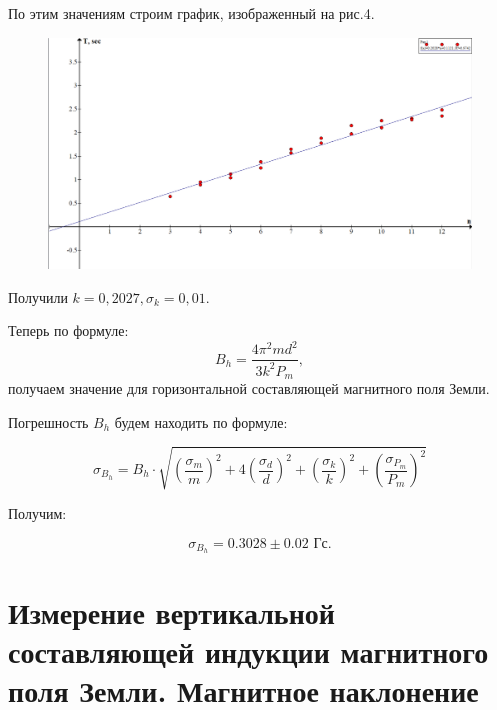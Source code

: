 По этим значениям строим график, изображенный на рис.4.

\begin{figure}[h!]
\begin{center}
\includegraphics[width=1 \textwidth]{pics/lab1231.png}
\end{center}
\end{figure}

Получили $k = 0,2027, \sigma_k = 0,01$.

Теперь по формуле:
\[B_h = \dfrac{4\pi^2md^2}{3k^2P_m},\]
получаем значение для горизонтальной составляющей магнитного поля Земли.

Погрешность $B_h$ будем находить по формуле:

\begin{equation}
\sigma_{B_h} = B_h\cdot\sqrt{ (\frac{\sigma_m}{m})^2  +  4(\frac{\sigma_d}{d})^2  +  (\frac{\sigma_k}{k})^2  +  (\frac{\sigma_{P_m}}{P_m})^2 }
\end{equation}

Получим:

\[\sigma_{B_h} = 0.3028\pm 0.02 \text{ Гс}.\]


\newpage

\section{Измерение вертикальной составляющей
индукции магнитного поля Земли.
Магнитное наклонение}

